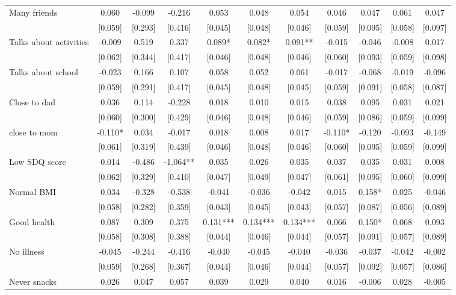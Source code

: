 \documentclass[12pt]{article}
\begin{document}
\begin{table}[ht]
\begin{center}
\begin{adjustbox}{width=1.2\textwidth,center=\textwidth}
\begin{tabular}{l*{10}{c}}
Many friends & 0.060 & -0.099 & -0.216 & 0.053 & 0.048 & 0.054 & 0.046 & 0.047 & 0.061 & 0.047 \\
 & [0.059] & [0.293] & [0.416] & [0.045] & [0.048] & [0.046] & [0.059] & [0.095] & [0.058] & [0.097] \\
Talks about activities & -0.009 & 0.519 & 0.337 & 0.089* & 0.082* & 0.091** & -0.015 & -0.046 & -0.008 & 0.017 \\
 & [0.062] & [0.344] & [0.417] & [0.046] & [0.048] & [0.046] & [0.060] & [0.093] & [0.059] & [0.098] \\
Talks about school & -0.023 & 0.166 & 0.107 & 0.058 & 0.052 & 0.061 & -0.017 & -0.068 & -0.019 & -0.096 \\
 & [0.059] & [0.291] & [0.417] & [0.045] & [0.048] & [0.045] & [0.059] & [0.091] & [0.058] & [0.087] \\
Close to dad & 0.036 & 0.114 & -0.228 & 0.018 & 0.010 & 0.015 & 0.038 & 0.095 & 0.031 & 0.021 \\
 & [0.060] & [0.300] & [0.429] & [0.046] & [0.048] & [0.046] & [0.059] & [0.086] & [0.059] & [0.099] \\
close to mom & -0.110* & 0.034 & -0.017 & 0.018 & 0.008 & 0.017 & -0.110* & -0.120 & -0.093 & -0.149 \\
 & [0.061] & [0.319] & [0.439] & [0.046] & [0.048] & [0.046] & [0.060] & [0.095] & [0.059] & [0.099] \\
Low SDQ score  & 0.014 & -0.486 & -1.064** & 0.035 & 0.026 & 0.035 & 0.037 & 0.035 & 0.031 & 0.008 \\
 & [0.062] & [0.329] & [0.410] & [0.047] & [0.049] & [0.047] & [0.061] & [0.095] & [0.060] & [0.099] \\
Normal BMI & 0.034 & -0.328 & -0.538 & -0.041 & -0.036 & -0.042 & 0.015 & 0.158* & 0.025 & -0.046 \\
 & [0.058] & [0.282] & [0.359] & [0.043] & [0.045] & [0.043] & [0.057] & [0.087] & [0.056] & [0.089] \\
Good health & 0.087 & 0.309 & 0.375 & 0.131*** & 0.134*** & 0.134*** & 0.066 & 0.150* & 0.068 & 0.093 \\
 & [0.058] & [0.308] & [0.388] & [0.044] & [0.046] & [0.044] & [0.057] & [0.091] & [0.057] & [0.089] \\
No illness & -0.045 & -0.244 & -0.416 & -0.040 & -0.045 & -0.040 & -0.036 & -0.037 & -0.042 & -0.002 \\
 & [0.059] & [0.268] & [0.367] & [0.044] & [0.046] & [0.044] & [0.057] & [0.092] & [0.057] & [0.086] \\
Never snacks & 0.026 & 0.047 & 0.057 & 0.039 & 0.029 & 0.040 & 0.016 & -0.006 & 0.028 & -0.005 \\

\end{tabular}
\end{adjustbox}
\end{center}
\end{table}
\end{document}
